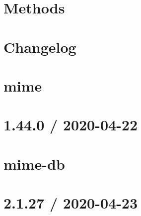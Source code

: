\let\mypdfximage\pdfximage\def\pdfximage{\immediate\mypdfximage}\documentclass[twoside]{book}
\newcommand{\+}{\discretionary{\mbox{\scriptsize$\hookleftarrow$}}{}{}}
\begin{document}
\chapter{Methods}
\label{md__c_1__git_hub__p_r_o_y_e_c_t_o-_i_i_i-_g_o_t_rest-api-node-mysql_node_modules_methods__r_e_a_d_m_e}

\chapter{Changelog}
\label{md__c_1__git_hub__p_r_o_y_e_c_t_o-_i_i_i-_g_o_t_rest-api-node-mysql_node_modules_mime__c_h_a_n_g_e_l_o_g}

\chapter{mime}
\label{md__c_1__git_hub__p_r_o_y_e_c_t_o-_i_i_i-_g_o_t_rest-api-node-mysql_node_modules_mime__r_e_a_d_m_e}

\chapter{1.44.0 / 2020-\/04-\/22}
\label{md__c_1__git_hub__p_r_o_y_e_c_t_o-_i_i_i-_g_o_t_rest-api-node-mysql_node_modules_mime-db__h_i_s_t_o_r_y}

\chapter{mime-\/db}
\label{md__c_1__git_hub__p_r_o_y_e_c_t_o-_i_i_i-_g_o_t_rest-api-node-mysql_node_modules_mime-db__r_e_a_d_m_e}

\chapter{2.1.27 / 2020-\/04-\/23}
\label{md__c_1__git_hub__p_r_o_y_e_c_t_o-_i_i_i-_g_o_t_rest-api-node-mysql_node_modules_mime-types__h_i_s_t_o_r_y}

\end{document}
